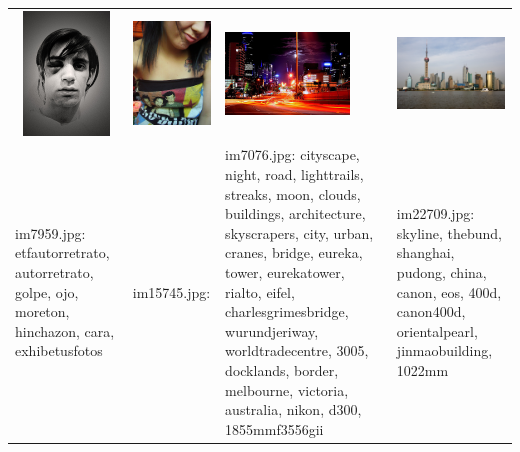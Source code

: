 \begin{tabular}{p{1.3in} p{1.3in} p{1.3in} p{1.3in} }
\includegraphics[keepaspectratio=false, height=1.3in, width=1.3in]{../datasets/mirflickr-test/im7959.jpg} & \includegraphics[keepaspectratio=false, height=1.3in, width=1.3in]{../datasets/mirflickr-training/im15745.jpg} & \includegraphics[keepaspectratio=false, height=1.3in, width=1.3in]{../datasets/mirflickr-training/im7076.jpg} & \includegraphics[keepaspectratio=false, height=1.3in, width=1.3in]{../datasets/mirflickr-training/im22709.jpg}\\
im7959.jpg: etfautorretrato, autorretrato, golpe, ojo, moreton, hinchazon, cara, exhibetusfotos & im15745.jpg:  & im7076.jpg: cityscape, night, road, lighttrails, streaks, moon, clouds, buildings, architecture, skyscrapers, city, urban, cranes, bridge, eureka, tower, eurekatower, rialto, eifel, charlesgrimesbridge, wurundjeriway, worldtradecentre, 3005, docklands, border, melbourne, victoria, australia, nikon, d300, 1855mmf3556gii & im22709.jpg: skyline, thebund, shanghai, pudong, china, canon, eos, 400d, canon400d, orientalpearl, jinmaobuilding, 1022mm\\
\end{tabular}

